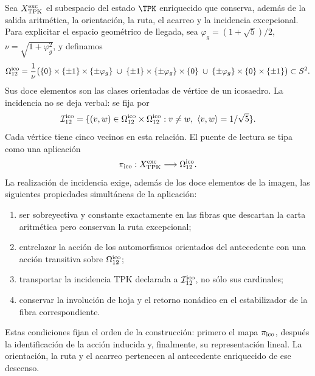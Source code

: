 Sea \(X_{\rm TPK}^{\rm exc}\) el subespacio del estado \(\TPK\) enriquecido
que conserva, adem\'as de la salida aritm\'etica, la orientaci\'on, la ruta,
el acarreo y la incidencia excepcional. Para explicitar el espacio geom\'etrico de llegada,
sea \(\varphi_g=(1+\sqrt5)/2\), \(\nu=\sqrt{1+\varphi_g^2}\), y definamos
\begin{equation}
\label{ii:ii:pent:eq:gravity-icosahedron-vertices}
\Omega_{12}^{\rm ico}
=\frac1\nu\bigl(
\{0\}\times\{\pm1\}\times\{\pm\varphi_g\}
\;\cup\;
\{\pm1\}\times\{\pm\varphi_g\}\times\{0\}
\;\cup\;
\{\pm\varphi_g\}\times\{0\}\times\{\pm1\}
\bigr)\subset S^2.
\end{equation}
Sus doce elementos son las clases orientadas de v\'ertice de un icosaedro.
La incidencia no se deja verbal: se fija por
\begin{equation}
\label{ii:ii:pent:eq:gravity-icosahedron-incidence}
\mathcal I_{12}^{\rm ico}
=\{(v,w)\in\Omega_{12}^{\rm ico}\times\Omega_{12}^{\rm ico}:
v\neq w,\ \langle v,w\rangle=1/\sqrt5\}.
\end{equation}
Cada v\'ertice tiene cinco vecinos en esta relaci\'on. El puente de lectura
se tipa como una aplicaci\'on
\begin{equation}
\label{ii:ii:pent:eq:gravity-exceptional-reader-map}
\pi_{\rm ico}:X_{\rm TPK}^{\rm exc}\longrightarrow\Omega_{12}^{\rm ico}.
\end{equation}
La realización de incidencia exige, además de los doce elementos de la
imagen, las siguientes propiedades simultáneas de la aplicación:
\begin{enumerate}[label=(\roman*)]
\item ser sobreyectiva y constante exactamente en las fibras que descartan
la carta aritm\'etica pero conservan la ruta excepcional;
\item entrelazar la acci\'on de los automorfismos orientados del antecedente
con una acci\'on transitiva sobre \(\Omega_{12}^{\rm ico}\);
\item transportar la incidencia TPK declarada a
\(\mathcal I_{12}^{\rm ico}\), no
s\'olo sus cardinales;
\item conservar la involuci\'on de hoja y el retorno non\'adico en el
estabilizador de la fibra correspondiente.
\end{enumerate}

Estas condiciones fijan el orden de la construcción: primero el mapa
\(\pi_{\rm ico}\), después la identificación de la acción inducida y,
finalmente, su representación lineal. La orientación, la ruta y el acarreo
pertenecen al antecedente enriquecido de ese descenso.


